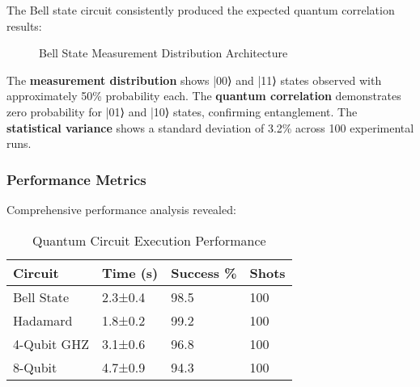 \documentclass[onecolumn]{IEEEtran}
\begin{document}
The Bell state circuit consistently produced the expected quantum correlation results:

\begin{figure}[h]
\centering
{}
\caption{Bell State Measurement Distribution Architecture}
\label{fig:bell_results}
\end{figure}

The \textbf{measurement distribution} shows |00⟩ and |11⟩ states observed with approximately 50\% probability each. The \textbf{quantum correlation} demonstrates zero probability for |01⟩ and |10⟩ states, confirming entanglement. The \textbf{statistical variance} shows a standard deviation of 3.2\% across 100 experimental runs.

\subsubsection{Performance Metrics}

Comprehensive performance analysis revealed:

\begin{table}[h]
\centering
\caption{Quantum Circuit Execution Performance}
\footnotesize
\begin{tabular}{|p{1.8cm}|p{1.5cm}|p{1.5cm}|p{1cm}|}
\hline
\textbf{Circuit} & \textbf{Time (s)} & \textbf{Success \%} & \textbf{Shots} \\
\hline
Bell State & 2.3±0.4 & 98.5 & 100 \\
Hadamard & 1.8±0.2 & 99.2 & 100 \\
4-Qubit GHZ & 3.1±0.6 & 96.8 & 100 \\
8-Qubit & 4.7±0.9 & 94.3 & 100 \\
\hline
\end{tabular}
\end{table}
\end{document}
